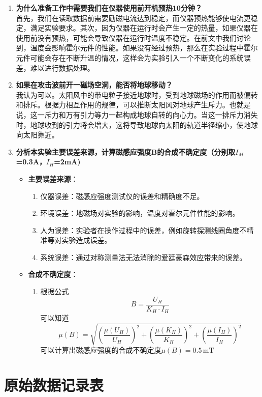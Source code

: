 \documentclass[zihao=5, UTF8]{article}
\theoremstyle{MyLineTheoremStyle} %
\theoremstyle{MyBlockTheoremStyle} %
\theoremstyle{MySubsubsectionStyle} %
\begin{document}
\begin{enumerate}
  \item \textbf{为什么准备工作中需要我们在仪器使用前开机预热10分钟？} \\
    首先，我们在读取数据前需要励磁电流达到稳定，而仪器预热能够使电流更稳定，满足实验要求。其次，因为仪器在运行时会产生一定的热量，如果仪器在使用前没有预热，可能会导致仪器在运行时温度不稳定。在前文中我们讨论到，温度会影响霍尔元件的性能。如果没有经过预热，那么在实验过程中霍尔元件可能会存在不断升温的情况，这样会为实验引入一个不断变化的系统误差，难以进行数据处理。
  \item \textbf{如果在攻击波前开一磁场空洞，能否将地球移动？} \\
    我认为可以。太阳风中的带电粒子接近地球时，受到地球磁场的作用而被偏转和排斥。根据力相互作用的规律，可以推断太阳风对地球产生斥力。也就是说，这一斥力和万有引力等力一起构成地球自转的向心力。当这一排斥力消失时，地球收到的引力将会增大，这将导致地球向太阳的轨道半径缩小，使地球向太阳靠近。
  \item \textbf{分析本实验主要误差来源，计算磁感应强度B的合成不确定度（分别取$I_M$=0.3A，$I_H$=2mA)}
    \begin{itemize}
      \item \textbf{主要误差来源}：
      \begin{enumerate}
        \item 仪器误差：磁感应强度测试仪的误差和精确度不足。
        \item 环境误差：地磁场对实验的影响，温度对霍尔元件性能的影响。
        \item 人为误差：实验者在操作过程中的误差，例如旋转探测线圈角度不精准等对实验造成误差。
        \item 系统误差：通过对称测量法无法消除的爱廷豪森效应带来的误差。
      \end{enumerate}
      \item \textbf{合成不确定度}：
      \begin{enumerate}
        \item 根据公式$$B = \frac{U_H}{K_H \cdot I_H}$$可以知道
          \[
\mu(B) = \sqrt{\left(\frac{\mu(U_H)}{U_H}\right)^2 + \left(\frac{\mu(K_H)}{K_H}\right)^2 + \left(\frac{\mu(I_H)}{I_H}\right)^2}
\]
可以计算出磁感应强度的合成不确定度$\mu(B) = 0.5 \, \text{mT}$
      \end{enumerate}
    \end{itemize}
\end{enumerate}

\section{原始数据记录表}

\end{document}
